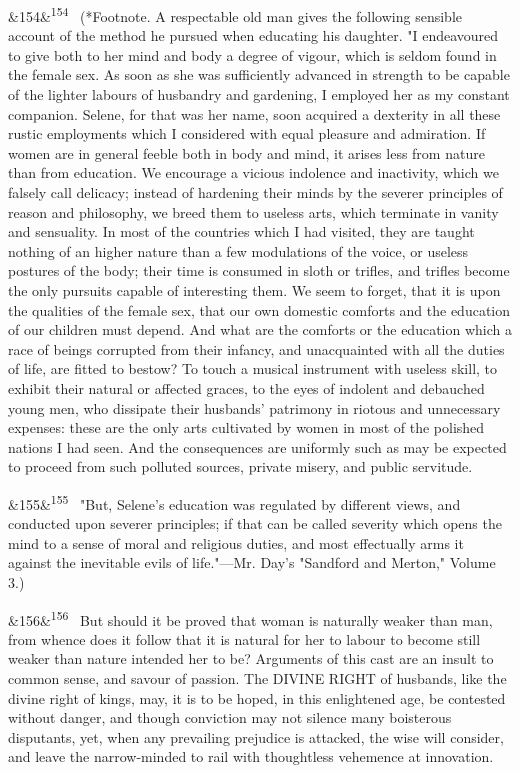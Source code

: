 \documentclass[12pt]{article}
\newcommand{\para}[1][]{\par\noindent\ifx&#1&\else\textsuperscript{\footnotesize #1}~\fi}
\begin{document}
\para[154] (*Footnote. A respectable old man gives the following sensible account of the method he pursued when educating his daughter. "I endeavoured to give both to her mind and body a degree of vigour, which is seldom found in the female sex. As soon as she was sufficiently advanced in strength to be capable of the lighter labours of husbandry and gardening, I employed her as my constant companion. Selene, for that was her name, soon acquired a dexterity in all these rustic employments which I considered with equal pleasure and admiration. If women are in general feeble both in body and mind, it arises less from nature than from education. We encourage a vicious indolence and inactivity, which we falsely call delicacy; instead of hardening their minds by the severer principles of reason and philosophy, we breed them to useless arts, which terminate in vanity and sensuality. In most of the countries which I had visited, they are taught nothing of an higher nature than a few modulations of the voice, or useless postures of the body; their time is consumed in sloth or trifles, and trifles become the only pursuits capable of interesting them. We seem to forget, that it is upon the qualities of the female sex, that our own domestic comforts and the education of our children must depend. And what are the comforts or the education which a race of beings corrupted from their infancy, and unacquainted with all the duties of life, are fitted to bestow? To touch a musical instrument with useless skill, to exhibit their natural or affected graces, to the eyes of indolent and debauched young men, who dissipate their husbands' patrimony in riotous and unnecessary expenses: these are the only arts cultivated by women in most of the polished nations I had seen. And the consequences are uniformly such as may be expected to proceed from such polluted sources, private misery, and public servitude.

\para[155] "But, Selene's education was regulated by different views, and conducted upon severer principles; if that can be called severity which opens the mind to a sense of moral and religious duties, and most effectually arms it against the inevitable evils of life."---Mr. Day's "Sandford and Merton," Volume 3.)

\para[156] But should it be proved that woman is naturally weaker than man, from whence does it follow that it is natural for her to labour to become still weaker than nature intended her to be? Arguments of this cast are an insult to common sense, and savour of passion. The DIVINE RIGHT of husbands, like the divine right of kings, may, it is to be hoped, in this enlightened age, be contested without danger, and though conviction may not silence many boisterous disputants, yet, when any prevailing prejudice is attacked, the wise will consider, and leave the narrow-minded to rail with thoughtless vehemence at innovation.
\end{document}
